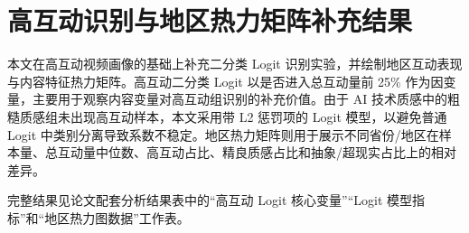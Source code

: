 \section{高互动识别与地区热力矩阵补充结果}

本文在高互动视频画像的基础上补充二分类 Logit 识别实验，并绘制地区互动表现与内容特征热力矩阵。高互动二分类 Logit 以是否进入总互动量前 25\% 作为因变量，主要用于观察内容变量对高互动组识别的补充价值。由于 AI 技术质感中的粗糙质感组未出现高互动样本，本文采用带 L2 惩罚项的 Logit 模型，以避免普通 Logit 中类别分离导致系数不稳定。地区热力矩阵则用于展示不同省份/地区在样本量、总互动量中位数、高互动占比、精良质感占比和抽象/超现实占比上的相对差异。

完整结果见论文配套分析结果表中的“高互动 Logit 核心变量”“Logit 模型指标”和“地区热力图数据”工作表。
